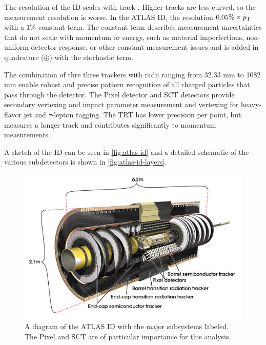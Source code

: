 The \pt resolution of the \ac{ID} scales with track \pt. Higher \pt tracks are less curved, so the measurement resolution is worse. In the \ac{ATLAS} \ac{ID}, the \pt resolution  $0.05\% \times p_{\text{T}}$ with a $1\%$ constant term. The constant term describes measurement uncertainties that do not scale with momentum or energy, such as material imperfections, non-uniform detector response, or other constant measurement issues and is added in quadrature ($\oplus$) with the stochastic term.

The combination of thre three trackers with radii ranging from 32.33 mm to 1082 mm enable robust and precise pattern recognition of all charged particles that pass through the detector. The Pixel detector and \ac{SCT} detectors provide secondary vertexing and impact parameter measurement and vertexing for heavy-flavor jet and $\tau$-lepton tagging. The \ac{TRT} has lower precision per point, but measures a longer track and contributes significantly to momentum measurements.


A sketch of the \ac{ID} can be seen in \autoref{fig:atlas-id} and a detailed schematic of the various subdetectors is shown in \autoref{fig:atlas-id-layers}. 


\begin{figure}[htbp]
\centering
\includegraphics[width=.8\textwidth]{figures/Detector/atlas-ID.jpg}
\caption{A diagram of the \ac{ATLAS} \ac{ID} with the major subsystems labeled. The Pixel and \ac{SCT} are of particular importance for this analysis.}
\label{fig:atlas-id}
\end{figure}

